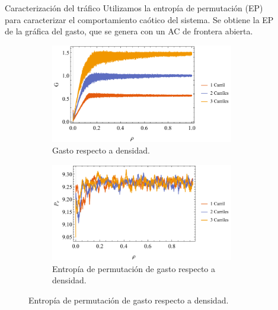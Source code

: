 \documentclass[final]{beamer}
\newlength{\sepwid}
\newlength{\onecolwid}
\newlength{\twocolwid}
\begin{document}
\begin{frame}[t]
\begin{columns}[t]
\begin{column}{\twocolwid}
\begin{columns}[t,totalwidth=\twocolwid]
\begin{column}{\onecolwid}
\end{column} %

\end{columns} %

\end{column} %

\begin{column}{\sepwid}\end{column} %

\begin{column}{\onecolwid} %

\begin{block}{Caracterización del tráfico}
Utilizamos la entropía de permutación (EP) para caracterizar el comportamiento caótico del sistema. Se obtiene la EP de la gráfica del gasto, que se genera con un AC de frontera abierta.

\begin{figure}[h!]
\begin{subfigure}{.5\textwidth}
	\centering
	\includegraphics[scale=1.2]{img/discharge_vs_density}
	\caption{Gasto respecto a densidad.}
\end{subfigure}%
\begin{subfigure}{.5\textwidth}
	\centering
	\includegraphics[scale=1.2]{img/pentropy_vs_density}
	\caption{Entropía de permutación de gasto respecto a densidad.}
\end{subfigure}%
\end{figure}


\end{block}
\end{column}
\end{columns}
\end{frame}
\end{document}
